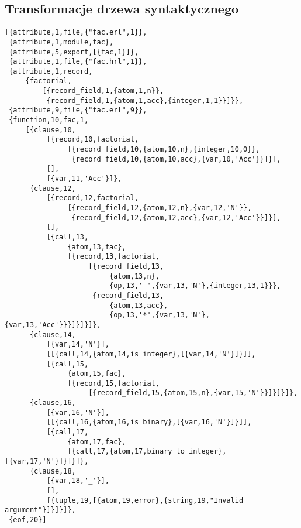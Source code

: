 \subsection{Transformacje drzewa syntaktycznego}
\begin{lstlisting}[style=erlang, caption=Drzewo syntaktyczne modułu fac, label=facAE]
[{attribute,1,file,{"fac.erl",1}},
 {attribute,1,module,fac},
 {attribute,5,export,[{fac,1}]},
 {attribute,1,file,{"fac.hrl",1}},
 {attribute,1,record,
     {factorial,
         [{record_field,1,{atom,1,n}},
          {record_field,1,{atom,1,acc},{integer,1,1}}]}},
 {attribute,9,file,{"fac.erl",9}},
 {function,10,fac,1,
     [{clause,10,
          [{record,10,factorial,
               [{record_field,10,{atom,10,n},{integer,10,0}},
                {record_field,10,{atom,10,acc},{var,10,'Acc'}}]}],
          [],
          [{var,11,'Acc'}]},
      {clause,12,
          [{record,12,factorial,
               [{record_field,12,{atom,12,n},{var,12,'N'}},
                {record_field,12,{atom,12,acc},{var,12,'Acc'}}]}],
          [],
          [{call,13,
               {atom,13,fac},
               [{record,13,factorial,
                    [{record_field,13,
                         {atom,13,n},
                         {op,13,'-',{var,13,'N'},{integer,13,1}}},
                     {record_field,13,
                         {atom,13,acc},
                         {op,13,'*',{var,13,'N'},{var,13,'Acc'}}}]}]}]},
      {clause,14,
          [{var,14,'N'}],
          [[{call,14,{atom,14,is_integer},[{var,14,'N'}]}]],
          [{call,15,
               {atom,15,fac},
               [{record,15,factorial,
                    [{record_field,15,{atom,15,n},{var,15,'N'}}]}]}]},
      {clause,16,
          [{var,16,'N'}],
          [[{call,16,{atom,16,is_binary},[{var,16,'N'}]}]],
          [{call,17,
               {atom,17,fac},
               [{call,17,{atom,17,binary_to_integer},[{var,17,'N'}]}]}]},
      {clause,18,
          [{var,18,'_'}],
          [],
          [{tuple,19,[{atom,19,error},{string,19,"Invalid argument"}]}]}]},
 {eof,20}]
\end{lstlisting}
